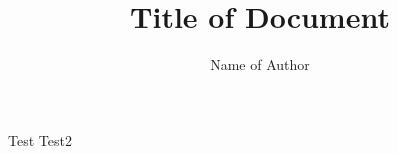 \documentclass{article}
\title{Title of Document}
\author{Name of Author}
\begin{document}
\maketitle
Test
Test2
\end{document}
